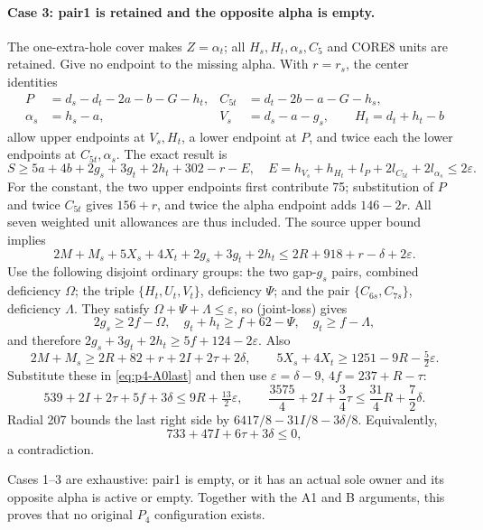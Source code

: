 \documentclass[11pt,letterpaper]{article}
\theoremstyle{definition}\newtheorem{definition}[theorem]{Definition}
\begin{document}
\paragraph{Case 3: pair1 is retained and the opposite alpha is empty.}
The one-extra-hole cover makes $Z=\alpha_t$; all $H_s,H_t,\alpha_s,C_5$
and CORE8 units are retained. Give no endpoint to the missing alpha.
With $r=r_s$, the center identities
\[
\begin{aligned}
 P&=d_s-d_t-2a-b-G-h_t,& C_{5t}&=d_t-2b-a-G-h_s,\\
 \alpha_s&=h_s-a,&V_s&=d_s-a-g_s,\qquad H_t=d_t+h_t-b
\end{aligned}
\]
allow upper endpoints at $V_s,H_t$, a lower endpoint at $P$, and twice
each the lower endpoints at $C_{5t},\alpha_s$. The exact result is
\[
 S\ge5a+4b+2g_s+3g_t+2h_t+302-r-E,
 \quad E=h_{V_s}+h_{H_t}+l_P+2l_{C_{5t}}+2l_{\alpha_s}
 \le2\varepsilon.                                \tag{A0-last-end}
\]
For the constant, the two upper endpoints first contribute 75; substitution
of $P$ and twice $C_{5t}$ gives $156+r$, and twice the alpha endpoint adds
$146-2r$. All seven weighted unit allowances are thus included.
The source upper bound implies
\begin{equation}
 2M+M_s+5X_s+4X_t+2g_s+3g_t+2h_t
 \le2R+918+r-\delta+2\varepsilon.                  \label{eq:p4-A0last}
\end{equation}
Use the following disjoint ordinary groups: the two gap-$g_s$ pairs,
combined deficiency $\Omega$; the triple $\{H_t,U_t,V_t\}$,
deficiency $\Psi$; and the pair $\{C_{6s},C_{7s}\}$,
deficiency $\Lambda$. They satisfy $\Omega+\Psi+\Lambda\le\varepsilon$,
so (joint-loss) gives
\[
 2g_s\ge2f-\Omega,\quad g_t+h_t\ge f+62-\Psi,
 \quad g_t\ge f-\Lambda,
\]
and therefore $2g_s+3g_t+2h_t\ge5f+124-2\varepsilon$.
Also
\[
 2M+M_s\ge2R+82+r+2I+2\tau+2\delta,
 \qquad5X_s+4X_t\ge1251-9R-\tfrac52\varepsilon.
\]
Substitute these in \eqref{eq:p4-A0last} and then use
$\varepsilon=\delta-9$, $4f=237+R-\tau$:
\[
 539+2I+2\tau+5f+3\delta\le9R+\tfrac{13}{2}\varepsilon,
 \qquad \frac{3575}{4}+2I+\frac34\tau
 \le\frac{31}{4}R+\frac72\delta.
\]
Radial 207 bounds the last right side by
$6417/8-31I/8-3\delta/8$. Equivalently,
\begin{equation}
 733+47I+6\tau+3\delta\le0,                        \label{eq:p4-A0case3}
\end{equation}
a contradiction.

Cases 1--3 are exhaustive: pair1 is empty, or it has an actual sole
owner and its opposite alpha is active or empty. Together with the A1
and B arguments, this proves that no original $P_4$ configuration exists.
\end{document}
